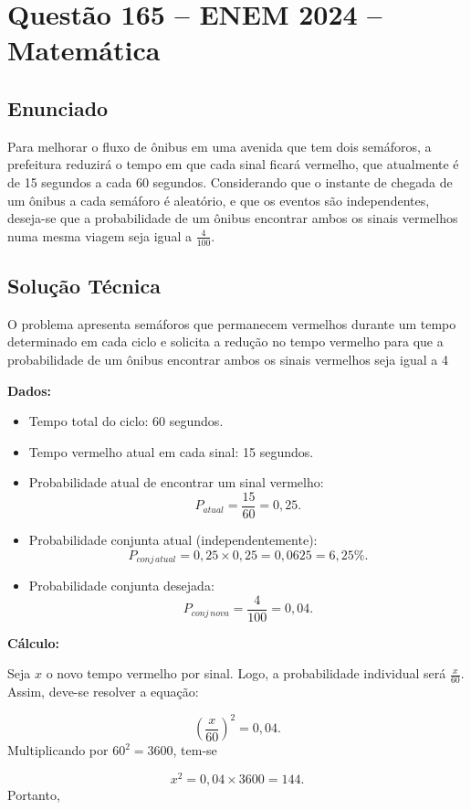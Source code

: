 \documentclass{article}
\begin{document}
\section*{Questão 165 -- ENEM 2024 -- Matemática}

\subsection*{Enunciado}
Para melhorar o fluxo de ônibus em uma avenida que tem dois semáforos, a prefeitura reduzirá o tempo em que cada sinal ficará vermelho, que atualmente é de 15 segundos a cada 60 segundos. Considerando que o instante de chegada de um ônibus a cada semáforo é aleatório, e que os eventos são independentes, deseja-se que a probabilidade de um ônibus encontrar ambos os sinais vermelhos numa mesma viagem seja igual a \( \frac{4}{100} \).

\subsection*{Solução Técnica}

O problema apresenta semáforos que permanecem vermelhos durante um tempo determinado em cada ciclo e solicita a redução no tempo vermelho para que a probabilidade de um ônibus encontrar ambos os sinais vermelhos seja igual a 4%

\textbf{Dados:}
\begin{itemize}
  \item Tempo total do ciclo: 60 segundos.
  \item Tempo vermelho atual em cada sinal: 15 segundos.
  \item Probabilidade atual de encontrar um sinal vermelho: \[ P_{atual} = \frac{15}{60} = 0,25. \]
  \item Probabilidade conjunta atual (independentemente): \[ P_{conj\, atual} = 0,25 \times 0,25 = 0,0625 = 6,25\%. \]
  \item Probabilidade conjunta desejada: \[ P_{conj\, nova} = \frac{4}{100} = 0,04. \]
\end{itemize}

\textbf{Cálculo:}

Seja \(x\) o novo tempo vermelho por sinal. Logo, a probabilidade individual será \(\frac{x}{60}\). Assim, deve-se resolver a equação:

\[
\left(\frac{x}{60}\right)^2 = 0,04.
\]
Multiplicando por \(60^2=3600\), tem-se

\[
x^2 = 0,04 \times 3600 = 144.
\]
Portanto,
\end{document}
